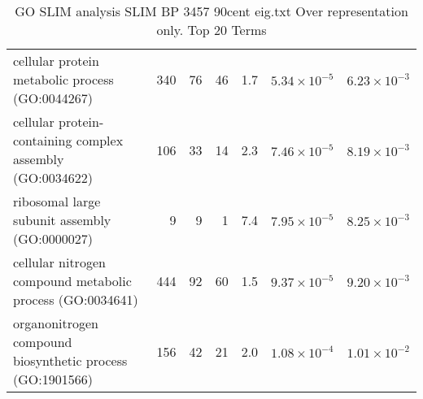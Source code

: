\begin{table}[ht]
\begin{adjustbox}{width=\textwidth}
\begin{tabular}{lrrrrrr}
  cellular protein metabolic process (GO:0044267) & 340 & 76 & 46 & 1.7 & $5.34 \times 10^{-5}$ & $6.23 \times 10^{-3}$ \\ 
  cellular protein-containing complex assembly (GO:0034622) & 106 & 33 & 14 & 2.3 & $7.46 \times 10^{-5}$ & $8.19 \times 10^{-3}$ \\ 
  ribosomal large subunit assembly (GO:0000027) & 9 & 9 & 1 & 7.4 & $7.95 \times 10^{-5}$ & $8.25 \times 10^{-3}$ \\ 
  cellular nitrogen compound metabolic process (GO:0034641) & 444 & 92 & 60 & 1.5 & $9.37 \times 10^{-5}$ & $9.20 \times 10^{-3}$ \\ 
  organonitrogen compound biosynthetic process (GO:1901566) & 156 & 42 & 21 & 2.0 & $1.08 \times 10^{-4}$ & $1.01 \times 10^{-2}$ \\ 
   \hline
\end{tabular}
\end{adjustbox}
\caption{GO SLIM analysis SLIM BP 3457 90cent eig.txt Over representation only. Top 20 Terms} 
\label{tab:GO SLIM analysis SLIM BP 3457 90cent eig.txt Over representation only. Top 20 Terms}
\end{table}



